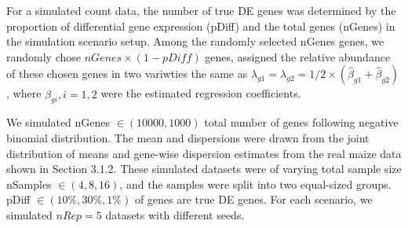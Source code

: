 For a simulated count data, the number of true DE genes was determined by the proportion of differential gene expression (pDiff)  and the total genes (nGenes) in the simulation scenario setup. Among the randomly selected nGenes genes, we randomly chose $nGenes \times (1-pDiff)$ genes, assigned the relative abundance of these chosen genes in two variwties the same as $\lambda_{g1} = \lambda_{g2} = 1/2\times(\hat{\beta}_{g1} + \hat{\beta}_{g2})$, where $\hat{\beta}_{gi}, i=1,2$ were the estimated regression coefficients.

We simulated nGenes $\in (10000, 1000)$ total number of genes following negative binomial distribution. The mean and dispersions were drawn from the joint distribution of means and gene-wise dispersion estimates from the real maize data \citep{paschold2012complementation} shown in Section 3.1.2. These simulated datasets were of varying total sample size nSamples $\in {(4,8,16)}$, and the samples were split into two equal-sized groups. pDiff $\in {(10\%, 30\%, 1\%)}$ of genes are true DE genes. For each scenario, we simulated $nRep = 5$ datasets with different seeds.









